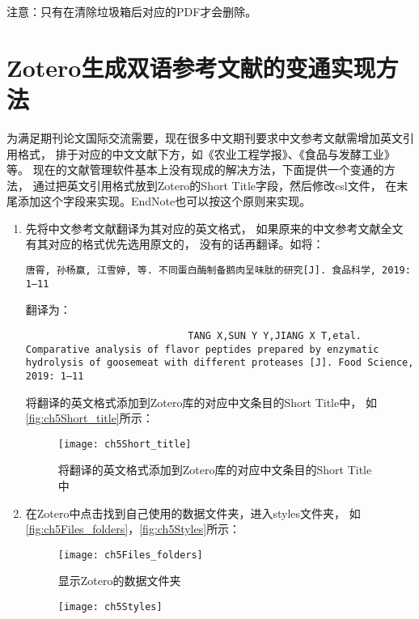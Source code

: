 \documentclass[cn,11pt,chinese]{elegantbook}
\begin{document}
	注意：只有在清除垃圾箱后对应的PDF才会删除。
	\section{Zotero生成双语参考文献的变通实现方法}\label{sec:Biolan}
				为满足期刊论文国际交流需要，现在很多中文期刊要求中文参考文献需增加英文引用格式，
				排于对应的中文文献下方，如《农业工程学报》、《食品与发酵工业》等。
				现在的文献管理软件基本上没有现成的解决方法，下面提供一个变通的方法，
				通过把英文引用格式放到Zotero的Short Title字段，然后修改csl文件，
				在末尾添加这个字段来实现。EndNote也可以按这个原则来实现。
				\begin{enumerate}
					\item 先将中文参考文献翻译为其对应的英文格式，
						如果原来的中文参考文献全文有其对应的格式优先选用原文的，
						没有的话再翻译。如将：
						\begin{lstlisting}[language=VBScript]
						唐霄, 孙杨赢, 江雪婷, 等. 不同蛋白酶制备鹅肉呈味肽的研究[J]. 食品科学, 2019: 1–11
						\end{lstlisting}
						翻译为：
						\begin{lstlisting}
							TANG X,SUN Y Y,JIANG X T,etal. Comparative analysis of flavor peptides prepared by enzymatic hydrolysis of goosemeat with different proteases [J]. Food Science, 2019: 1–11
						\end{lstlisting}
						将翻译的英文格式添加到Zotero库的对应中文条目的Short Title中，
						如\autoref{fig:ch5Short_title}所示：
						\begin{figure}[ht]
							\centering
							\texttt{[image: ch5Short\_title]}
							\caption{将翻译的英文格式添加到Zotero库的对应中文条目的Short Title中}
							\label{fig:ch5Short_title}
						\end{figure}
						\item 在Zotero中点击找到自己使用的数据文件夹，进入styles文件夹，
							如\autoref{fig:ch5Files_folders}，\autoref{fig:ch5Styles}所示：
							\begin{figure}[ht]
								\centering
								\texttt{[image: ch5Files\_folders]}
								\caption{显示Zotero的数据文件夹}
								\label{fig:ch5Files_folders}
							\end{figure}
							\begin{figure}[ht]
								\centering
								\texttt{[image: ch5Styles]}

\end{figure}
\end{enumerate}
\end{document}
